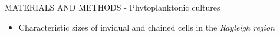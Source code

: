 \documentclass[handout]{beamer}
\newcommand\Fontable{\fontsize{9}{10}\selectfont}
\begin{document}
\begin{frame}{MATERIALS AND METHODS - Phytoplanktonic cultures}
\begin{minipage}[c]{1\linewidth}
\begin{minipage}[c]{0.7\linewidth}
\begin{itemize}
	\Fontable
	\item<3-> Characteristic sizes of invidual and chained cells in the \textit{Rayleigh region}
\end{itemize}
\end{minipage}
\begin{minipage}[c]{0.29\linewidth}
\end{minipage}
\end{minipage}


\end{frame}
\end{document}
